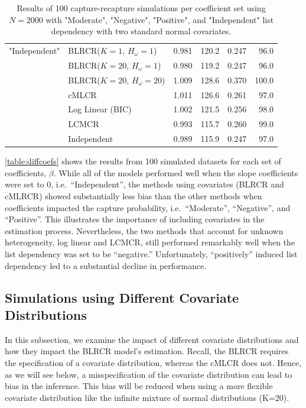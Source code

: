 \documentclass[
  12pt,
]{article}
\begin{document}
\begin{table}[H]
\begin{tabular}{||r l r r r r||}
 \hline
 "Independent" & BLRCR($K=1$, $H_\omega=1$)  & 0.981   & 120.2   & 0.247   & 96.0 \\ 
               & BLRCR($K=20$, $H_\omega=1$)    & 0.980     & 119.2     & 0.247     & 96.0 \\ 
               & BLRCR($K=20$, $H_\omega=20$)    & 1.009     & 128.6     & 0.370     & 100.0 \\                
               & cMLCR       & 1.011       & 126.6      & 0.261      & 97.0 \\
               & Log Linear (BIC)  & 1.002      & 121.5     & 0.256     & 98.0 \\ 
               & LCMCR       & 0.993       & 115.7      & 0.260      & 99.0 \\ 
               & Independent & 0.989 & 115.9& 0.247& 97.0 \\ 
 \hline
\end{tabular}
\caption{Results of 100 capture-recapture simulations per coefficient set using $N=2000$ with "Moderate", "Negative", "Positive", and "Independent" list dependency with two standard normal covariates. }
\label{table:diffcoefs}
\end{table}
\doublespacing

\autoref{table:diffcoefs} shows the results from 100 simulated datasets
for each set of coefficients, \(\beta\). While all of the models
performed well when the slope coefficients were set to 0,
i.e.~``Independent'', the methods using covariates (BLRCR and cMLRCR)
showed substantially less bias than the other methods when coefficients
impacted the capture probability, i.e.~``Moderate'', ``Negative'', and
``Positive''. This illustrates the importance of including covariates in
the estimation process. Nevertheless, the two methods that account for
unknown heterogeneity, log linear and LCMCR, still performed remarkably
well when the list dependency was set to be ``negative.'' Unfortunately,
``positively'' induced list dependency led to a substantial decline in
performance.

\subsection{Simulations using Different Covariate Distributions}
\label{Sec:simscovdists}

In this subsection, we examine the impact of different covariate
distributions and how they impact the BLRCR model's estimation. Recall,
the BLRCR requires the specification of a covariate distribution,
whereas the cMLCR does not. Hence, as we will see below, a
misspecification of the covariate distribution can lead to bias in the
inference. This bias will be reduced when using a more flexible
covariate distribution like the infinite mixture of normal distributions
(K=20).
\end{document}
